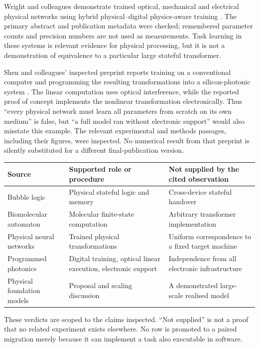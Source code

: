 \documentclass[11pt,a4paper]{article}
\theoremstyle{definition}
\theoremstyle{remark}
\begin{document}
Wright and colleagues demonstrate trained optical, mechanical and electrical physical networks using hybrid physical--digital physics-aware training \citep{wright}. The primary abstract and publication metadata were checked; remembered parameter counts and precision numbers are not used as measurements. Task learning in these systems is relevant evidence for physical processing, but it is not a demonstration of equivalence to a particular large stateful transformer.

Shen and colleagues' inspected preprint reports training on a conventional computer and programming the resulting transformations into a silicon-photonic system \citep{shen}. The linear computation uses optical interference, while the reported proof of concept implements the nonlinear transformation electronically. Thus ``every physical network must learn all parameters from scratch on its own medium'' is false, but ``a full model ran without electronic support'' would also misstate this example. The relevant experimental and methods passages, including their figures, were inspected. No numerical result from that preprint is silently substituted for a different final-publication version.

\begin{center}\small
\begin{tabular}{@{}>{\raggedright\arraybackslash}p{}>{\raggedright\arraybackslash}p{}>{\raggedright\arraybackslash}p{}@{}}\toprule
Source & Supported role or procedure & Not supplied by the cited observation\\\midrule
Bubble logic \citep{bubble} & Physical stateful logic and memory & Cross-device stateful handover\\
Biomolecular automaton \citep{benenson} & Molecular finite-state computation & Arbitrary transformer implementation\\
Physical neural networks \citep{wright} & Trained physical transformations & Uniform correspondence to a fixed target machine\\
Programmed photonics \citep{shen} & Digital training, optical linear execution, electronic support & Independence from all electronic infrastructure\\
Physical foundation models \citep{pfm} & Proposal and scaling discussion & A demonstrated large-scale realised model\\\bottomrule
\end{tabular}
\end{center}
These verdicts are scoped to the claims inspected. ``Not supplied'' is not a proof that no related experiment exists elsewhere. No row is promoted to a paired migration merely because it can implement a task also executable in software.
\end{document}
